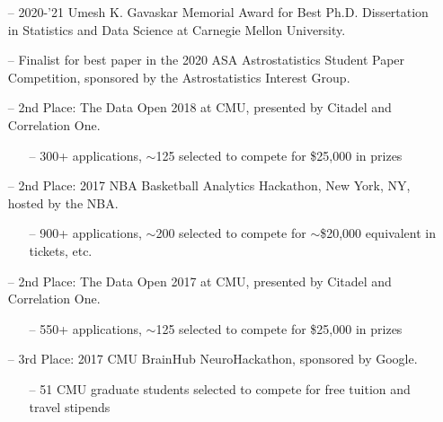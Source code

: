 \documentclass[letterpaper,10pt]{article}
\begin{document}
\begin{itemize}
\item[--] 2020-'21 Umesh K. Gavaskar Memorial Award for Best Ph.D. Dissertation in Statistics and Data Science at Carnegie Mellon University.

\vspace{0.05cm}

\item[--] Finalist for best paper in the 2020 ASA Astrostatistics Student Paper Competition, sponsored by the Astrostatistics Interest Group.

\vspace{0.05cm}

\item[--] 2nd Place: The Data Open 2018 at CMU, presented by Citadel and Correlation One.
\begin{itemize}
\vspace{-0.15cm}
\item[--] 300+ applications, $\sim$125 selected to compete for \$25,000 in prizes
\end{itemize}

\vspace{0.05cm}

\item[--] 2nd Place: 2017 NBA Basketball Analytics Hackathon, New York, NY, hosted by the NBA.
\begin{itemize}
\vspace{-0.15cm}
\item[--] 900+ applications, $\sim$200 selected to compete for $\sim$\$20,000 equivalent in tickets, etc.
\end{itemize}

\vspace{0.05cm}

\item[--] 2nd Place: The Data Open 2017 at CMU, presented by Citadel and Correlation One.
\begin{itemize}
\vspace{-0.15cm}
\item[--] 550+ applications, $\sim$125 selected to compete for \$25,000 in prizes
\end{itemize}

\vspace{0.05cm}

\item[--] 3rd Place: 2017 CMU BrainHub NeuroHackathon, sponsored by Google.
\begin{itemize}
\vspace{-0.15cm}
\item[--] 51 CMU graduate students selected to compete for free tuition and travel stipends
\end{itemize}
\end{itemize}
\end{document}
